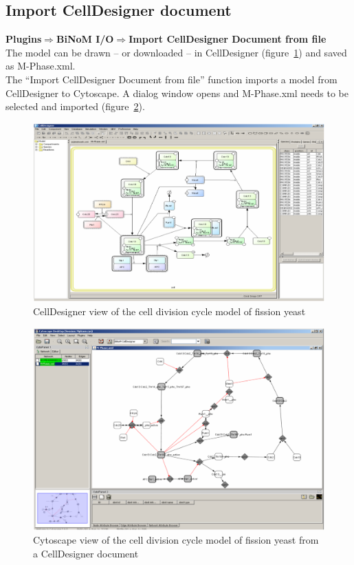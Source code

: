 \subsection{Import CellDesigner document}
\textbf{Plugins$\Rightarrow$BiNoM I/O$\Rightarrow$Import CellDesigner Document from file}\\
The model can be drawn – or downloaded\cite{novak1998model} – in CellDesigner (figure~\ref{CellDesigner_view_of_yeast_cell_division}) and saved as M-Phase.xml.\\
The “Import CellDesigner Document from file” function imports a model from CellDesigner to Cytoscape.  A dialog window opens and M-Phase.xml needs to be selected and imported (figure~\ref{Cytoscape_view_of_yeast_cell_division}).\\
\begin{figure}
\centering
\includegraphics[width=18 cm]{graphics/CellDesigner_view_of_yeast_cell_division}
\caption{CellDesigner view of the cell division cycle model of fission yeast\cite{novak1998model}}
\label{CellDesigner_view_of_yeast_cell_division}
\end{figure}\begin{figure}
\centering
\includegraphics[width=18 cm]{graphics/Cytoscape_view_of_yeast_cell_division}
\caption{Cytoscape view of the cell division cycle model of fission yeast from a CellDesigner document}
\label{Cytoscape_view_of_yeast_cell_division}
\end{figure}
